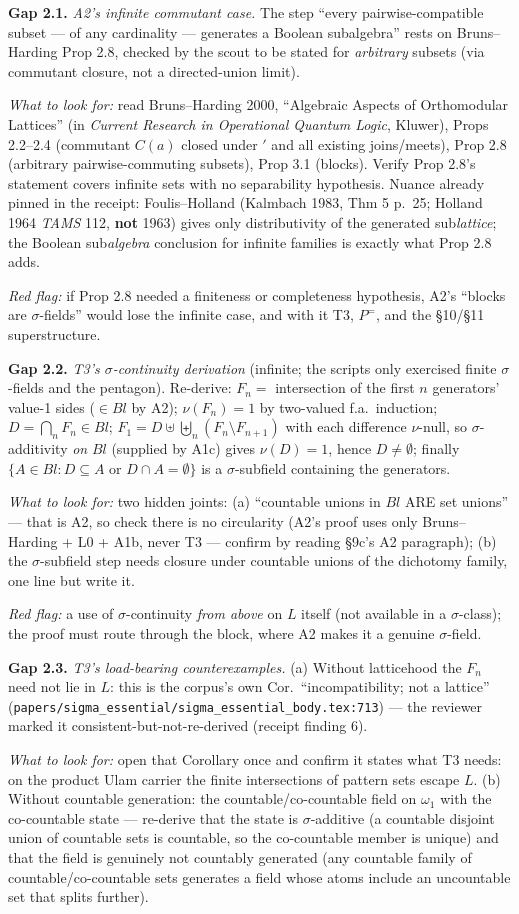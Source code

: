 \documentclass[11pt]{article}
\newcommand{\file}[1]{\texttt{\small #1}}
\newcommand{\gap}[1]{\medskip\noindent\textbf{Gap #1.}}
\newcommand{\lookfor}{\par\smallskip\noindent\emph{What to look for:} }
\newcommand{\redflag}{\par\smallskip\noindent\emph{Red flag:} }
\begin{document}
\gap{2.1} \emph{A2's infinite commutant case.} The step ``every
pairwise-compatible subset --- of any cardinality --- generates a
Boolean subalgebra'' rests on Bruns--Harding Prop 2.8, checked by the
scout to be stated for \emph{arbitrary} subsets (via commutant
closure, not a directed-union limit).
\lookfor read Bruns--Harding 2000, ``Algebraic Aspects of Orthomodular
Lattices'' (in \emph{Current Research in Operational Quantum Logic},
Kluwer), Props 2.2--2.4 (commutant $C(a)$ closed under $'$ and all
existing joins/meets), Prop 2.8 (arbitrary pairwise-commuting subsets),
Prop 3.1 (blocks). Verify Prop 2.8's statement covers infinite sets
with no separability hypothesis. Nuance already pinned in the receipt:
Foulis--Holland (Kalmbach 1983, Thm 5 p.~25; Holland 1964 \emph{TAMS}
112, \textbf{not} 1963) gives only distributivity of the generated
sub\emph{lattice}; the Boolean sub\emph{algebra} conclusion for
infinite families is exactly what Prop 2.8 adds.
\redflag if Prop 2.8 needed a finiteness or completeness hypothesis,
A2's ``blocks are $\sigma$-fields'' would lose the infinite case, and
with it T3, $P^=$, and the \S10/\S11 superstructure.

\gap{2.2} \emph{T3's $\sigma$-continuity derivation} (infinite; the
scripts only exercised finite $\sigma$-fields and the pentagon).
Re-derive: $F_n = $ intersection of the first $n$ generators'
value-1 sides ($\in Bl$ by A2); $\nu(F_n) = 1$ by two-valued f.a.\
induction; $D = \bigcap_n F_n \in Bl$;
$F_1 = D \uplus \biguplus_n (F_n \setminus F_{n+1})$ with each
difference $\nu$-null, so $\sigma$-additivity \emph{on} $Bl$
(supplied by A1c) gives $\nu(D) = 1$, hence $D \neq \emptyset$;
finally $\{A \in Bl : D \subseteq A \text{ or } D \cap A =
\emptyset\}$ is a $\sigma$-subfield containing the generators.
\lookfor two hidden joints: (a) ``countable unions in $Bl$ ARE set
unions'' --- that is A2, so check there is no circularity (A2's proof
uses only Bruns--Harding + L0 + A1b, never T3 --- confirm by reading
\S9c's A2 paragraph); (b) the $\sigma$-subfield step needs closure
under countable unions of the dichotomy family, one line but write it.
\redflag a use of $\sigma$-continuity \emph{from above} on $L$ itself
(not available in a $\sigma$-class); the proof must route through the
block, where A2 makes it a genuine $\sigma$-field.

\gap{2.3} \emph{T3's load-bearing counterexamples.} (a) Without
latticehood the $F_n$ need not lie in $L$: this is the corpus's own
Cor.\ ``incompatibility; not a lattice''
(\file{papers/sigma\_essential/sigma\_essential\_body.tex:713}) --- the reviewer marked it
consistent-but-not-re-derived (receipt finding 6).
\lookfor open that Corollary once and confirm it states what T3 needs:
on the product Ulam carrier the finite intersections of pattern sets
escape $L$. (b) Without countable generation: the
countable/co-countable field on $\omega_1$ with the co-countable
state --- re-derive that the state is $\sigma$-additive (a countable
disjoint union of countable sets is countable, so the co-countable
member is unique) and that the field is genuinely not countably
generated (any countable family of countable/co-countable sets
generates a field whose atoms include an uncountable set that splits
further).
\end{document}
